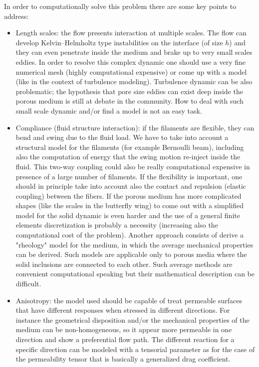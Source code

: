In order to computationally solve this problem there are some key points to address:
\begin{itemize}
	\item Length scales: the flow presents interaction at multiple scales. The flow can develop Kelvin–Helmholtz type instabilities on the interface (of size $h$) and they can even penetrate inside the medium and brake up to very small scales eddies. In order to resolve this complex dynamic one should use a very fine numerical mesh (highly computational expensive) or come up with a model (like in the context of turbulence modeling).
	Turbulence dynamic can be also problematic; the hypothesis that pore size eddies can exist deep inside the porous medium is still at debate in the community.
	How to deal with such small scale dynamic and/or find a model is not an easy task. 
	
	\item Compliance (fluid structure interaction): if the filaments are flexible, they can bend and swing due to the fluid load.
	We have to take into account a structural model for the filaments (for example Bernoulli beam), including also the computation of energy that the swing motion re-inject inside the fluid.
	This two-way coupling could also be really computational expensive in presence of a large number of filaments. If the flexibility is important, one should in principle take into account also the contact and repulsion (elastic coupling) between the fibers.
	If the porous medium has more complicated shapes (like the scales in the butterfly wing) to come out with a simplified model for the solid dynamic is even harder and the use of a general finite elements discretization is probably a necessity (increasing also the computational cost of the problem).
	Another approach consists of derive a "rheology" model for the medium, in which the average mechanical properties can be derived.
	Such models are applicable only to porous media where the solid inclusions are connected to each other. Such average methods are convenient computational speaking but their mathematical description can be difficult.
	
	\item Anisotropy: the model used should be capable of treat permeable surfaces that have different responses when stressed in different directions. For instance the geometrical disposition and/or the mechanical properties of the medium can be non-homogeneous, so it appear more permeable in one direction and show a preferential flow path. The different reaction for a specific direction can be modeled with a tensorial parameter as for the case of the permeability tensor that is basically a generalized drag coefficient.
\end{itemize}

